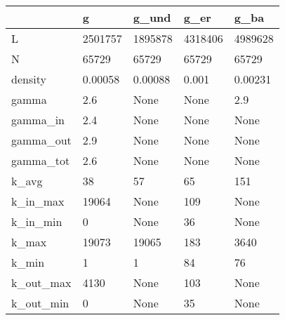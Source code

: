 \begin{tabular}{lllll}
\toprule
{} &        g &    g\_und &     g\_er &     g\_ba \\
\midrule
L         &  2501757 &  1895878 &  4318406 &  4989628 \\
N         &    65729 &    65729 &    65729 &    65729 \\
density   &  0.00058 &  0.00088 &    0.001 &  0.00231 \\
gamma     &      2.6 &     None &     None &      2.9 \\
gamma\_in  &      2.4 &     None &     None &     None \\
gamma\_out &      2.9 &     None &     None &     None \\
gamma\_tot &      2.6 &     None &     None &     None \\
k\_avg     &       38 &       57 &       65 &      151 \\
k\_in\_max  &    19064 &     None &      109 &     None \\
k\_in\_min  &        0 &     None &       36 &     None \\
k\_max     &    19073 &    19065 &      183 &     3640 \\
k\_min     &        1 &        1 &       84 &       76 \\
k\_out\_max &     4130 &     None &      103 &     None \\
k\_out\_min &        0 &     None &       35 &     None \\
\bottomrule
\end{tabular}
